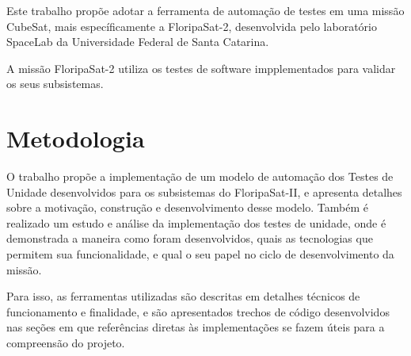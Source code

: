 Este trabalho propõe adotar a ferramenta de automação de testes em uma missão CubeSat, mais específicamente a FloripaSat-2, desenvolvida
pelo laboratório SpaceLab da Universidade Federal de Santa Catarina.

A missão FloripaSat-2 utiliza os testes de software impplementados para validar os seus subsistemas.

\section{Metodologia}
\label{fundamentacao:metodologia}

O trabalho propõe a implementação de um modelo de automação dos Testes de Unidade desenvolvidos para os subsistemas do FloripaSat-II, e apresenta detalhes sobre a motivação, construção e desenvolvimento desse modelo. Também é realizado um estudo e análise da implementação dos testes de unidade, onde é demonstrada a maneira como foram desenvolvidos, quais as tecnologias que permitem sua funcionalidade, e qual o seu papel no ciclo de desenvolvimento da missão.

Para isso, as ferramentas utilizadas são descritas em detalhes técnicos de funcionamento e finalidade, e são apresentados trechos de código desenvolvidos nas seções em que referências diretas às implementações se fazem úteis para a compreensão do projeto.

